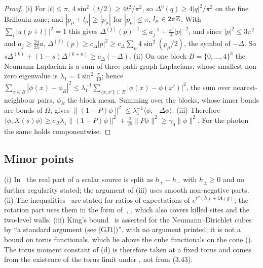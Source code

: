 \begin{proof}
(i) For $|t|\le\pi$, $4\sin^2(t/2)\ge4t^2/\pi^2$, so $\Delta^\eta(q)\ge4|q|^2/\pi^2$ on the fine Brillouin zone; and $|p_\mu+l_\mu|\ge|p_\mu|$ for $|p_\mu|\le\pi$, $l_\mu\in2\pi\mathbb Z$. With $\sum_l|u(p+l)|^2=1$ this gives $\Delta^{(j)}(p)^{-1}\le a_j^{-1}+\frac{\pi^2}4|p|^{-2}$, and since $|p|^2\le3\pi^2$ and $a_j\ge\frac{24}{25}a$, $\Delta^{(j)}(p)\ge c_\Delta|p|^2\ge c_\Delta\sum_\mu4\sin^2(p_\mu/2)$, the symbol of $-\Delta$. So $s\Delta^{(k)}+(1-s)\Delta^{(k+n)}\ge c_\Delta(-\Delta)$.
(ii) On one block $B=\{0,\dots,4\}^3$ the Neumann Laplacian is a sum of three path-graph Laplacians, whose smallest non-zero eigenvalue is $\lambda_1=4\sin^2\frac\pi{10}$; hence $\sum_{x\in B}|\phi(x)-\phi_B|^2\le\lambda_1^{-1}\sum_{\{x,x'\}\subset B}|\phi(x)-\phi(x')|^2$, the sum over nearest-neighbour pairs, $\phi_B$ the block mean. Summing over the blocks, whose inner bonds are bonds of $\Omega$, gives $\|(1-P)\phi\|^2\le\lambda_1^{-1}\langle\phi,-\Delta\phi\rangle$.
(iii) Therefore $\langle\phi,X(s)\phi\rangle\ge c_\Delta\lambda_1\|(1-P)\phi\|^2+\frac a{25}\|P\phi\|^2\ge\gamma_0\|\phi\|^2$. For the photon the same holds componentwise.
\end{proof}

\subsection{Minor points}

\begin{remark}\label{rot:rem:minor}
(i) In~\cite[(3.41)]{K2} the real part of a scalar source is split as $h_+-h_-$ with $h_\pm\ge0$ and no further regularity stated; the argument of (iii) uses smooth non-negative parts.
(ii) The inequalities~\cite[(3.24)--(3.29)]{K2} are stated for ratios of expectations of $e^{r^2(h)+\mathrm iA(g)}$; the rotation part uses them in the form of~\cite[Thms.~6.1, 6.2]{BFS1}, , which also covers killed sites and the two-level walls.
(iii) King's bound~\cite[(3.43)]{K2} is asserted for the Neumann--Dirichlet cubes by ``a standard argument (see [GJ1])'', with no argument printed; it is not a bound on torus functionals, which lie above the cube functionals on the cone (). The torus moment constant of (d) is therefore taken at a fixed torus and comes from the existence of the torus limit under \Ka, not from (3.43).
\end{remark}
